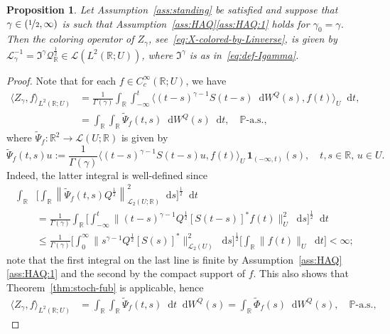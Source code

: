 \documentclass[reqno]{amsart}
\numberwithin{equation}{section}
\newcommand{\bbP}{\mathbb{P}}
\newcommand{\bbR}{\mathbb{R}}
\newcommand{\cL}{\mathcal{L}}
\newcommand{\cQ}{\mathcal{Q}}
\newcommand{\norm}[2]{     \| #1       \|_{ #2 }}
\newcommand{\Norm}[2]{\left\| #1 \right\|_{ #2 }}
\newcommand{\scalar}[2]{     \langle #1       \rangle_{ #2 }}
\newcommand{\rd}{\mathop{}\!\mathrm{d}}
\newcommand{\from}{\colon}
\newcommand{\LO}{\mathscr L}
\newtheorem{proposition}[lemma]{Proposition}
\theoremstyle{remark}
\theoremstyle{definition}
\begin{document}
\begin{proposition}
	Let
	Assumption~\textup{\ref{ass:standing}} be
	satisfied and suppose that $\gamma \in (\nicefrac{1}{2},\infty)$
	is such that Assumption~\textup{\ref{ass:HAQ}\ref{ass:HAQ:1}} 
	holds for $\gamma_0 = \gamma$.
	Then
	the coloring operator of
	$Z_\gamma$, see~\eqref{eq:X-colored-by-Linverse}, is given by 
	$\cL^{-1}_\gamma = \mathfrak I^{\gamma} \cQ_{\bbR}^\frac{1}{2}  \in \LO(L^2(\bbR; U))$,
	where $\mathfrak I^\gamma$ is as in~\eqref{eq:def-Igamma}.
\end{proposition}
%
\begin{proof}
	Note that for each $f \in C_c^\infty(\bbR; U)$, we have
	\begin{align}
		\scalar{Z_\gamma, f}{L^2(\bbR; U)}
		&=
		\frac{1}{\Gamma(\gamma)} \int_\bbR \int_{-\infty}^t \scalar{(t-s)^{\gamma-1}S(t-s) \rd W^Q(s), f(t)}{U} \rd t, 
		\\
		&= 
		\int_\bbR \int_\bbR \widetilde \Psi_f(t,s) \rd W^Q(s) \rd t,
		\quad \bbP\text{-a.s.},
	\end{align}
	where $\widetilde \Psi_f \from \bbR^2 \to \LO(U; \bbR)$ is given by 
	\begin{equation}
		\widetilde \Psi_f(t,s)u
		:= 
		\frac{1}{\Gamma(\gamma)}\scalar{(t-s)^{\gamma-1} S(t-s) u, f(t)}{U} \, \mathbf 1_{(-\infty, t)}(s),
		\quad 
		t, s \in \bbR,\,  u \in U.
	\end{equation}
	Indeed, the latter integral is well-defined since
	\begin{align*}
		\int_\bbR &\biggl[\int_\bbR \Norm{\widetilde \Psi_f(t,s) Q^{\frac{1}{2}}}{\LO_2(U; \bbR)}^2 \rd s\biggr]^{\frac{1}{2}} \rd t
		\\
		&=
		\frac{1}{\Gamma(\gamma)}
		\int_\bbR \biggl[\int_{-\infty}^t \norm{(t-s)^{\gamma-1} Q^\frac{1}{2}[S(t-s)]^* f(t)}{U}^2 \rd s\biggr]^{\frac{1}{2}} \rd t 
		\\
		&\le 
		\frac{1}{\Gamma(\gamma)}
		\biggl[\int_0^\infty \norm{s^{\gamma-1} Q^\frac{1}{2}[S(s)]^*}{\LO_2(U)}^2 \rd s\biggr]^{\frac{1}{2}}
		\biggl[\int_\bbR \norm{f(t)}{U}  \rd t\biggr]  < \infty;
	\end{align*}
	note that the first integral on the last line is finite by Assumption~\ref{ass:HAQ}\ref{ass:HAQ:1} 
	and the second by the compact support of $f$.
	This also shows that Theorem~\ref{thm:stoch-fub} is applicable, hence
	\begin{align}
		\scalar{Z_\gamma, f}{L^2(\bbR; U)}
		&=
		\int_\bbR \int_\bbR \widetilde \Psi_f(t,s) \rd t \rd W^Q(s)
		=
		\int_\bbR \widetilde \Phi_f(s) \rd W^Q(s), \quad \bbP\text{-a.s.},

\end{align}
\end{proof}
\end{document}
